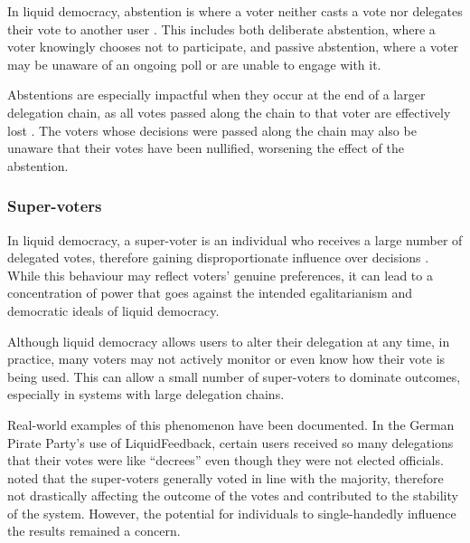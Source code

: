 In liquid democracy, abstention is where a voter neither casts a vote nor delegates their vote to another user \citep{brill_liquid_2022}. This includes both deliberate abstention, where a voter knowingly chooses not to participate, and passive abstention, where a voter may be unaware of an ongoing poll or are unable to engage with it.

Abstentions are especially impactful when they occur at the end of a larger delegation chain, as all votes passed along the chain to that voter are effectively lost \citep{brill_liquid_2022}. The voters whose decisions were passed along the chain may also be unaware that their votes have been nullified, worsening the effect of the abstention.

\subsubsection{Super-voters}
In liquid democracy, a super-voter is an individual who receives a large number of delegated votes, therefore gaining disproportionate influence over decisions \citep{kling2015votingbehaviourpoweronline}. While this behaviour may reflect voters' genuine preferences, it can lead to a concentration of power that goes against the intended egalitarianism and democratic ideals of liquid democracy.

Although liquid democracy allows users to alter their delegation at any time, in practice, many voters may not actively monitor or even know how their vote is being used. This can allow a small number of super-voters to dominate outcomes, especially in systems with large delegation chains.

Real-world examples of this phenomenon have been documented. In the German Pirate Party's use of LiquidFeedback, certain users received so many delegations that their votes were like ``decrees'' \citep{sven_becker_liquid_2012,kling2015votingbehaviourpoweronline} even though they were not elected officials. \cite{kling2015votingbehaviourpoweronline} noted that the super-voters generally voted in line with the majority, therefore not drastically affecting the outcome of the votes and contributed to the stability of the system. However, the potential for individuals to single-handedly influence the results remained a concern.

